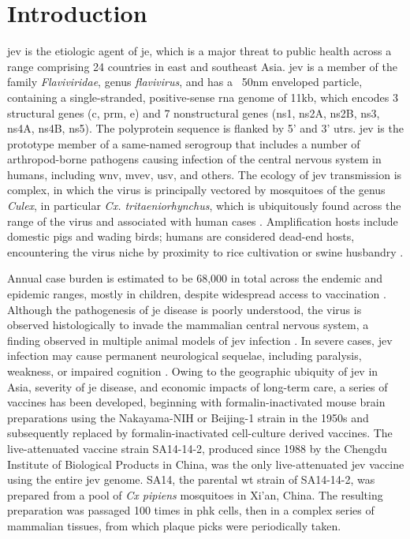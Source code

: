 \section{Introduction}
\Gls{jev} is the etiologic agent of \gls{je}, which is a major threat to public health across a range comprising 24 countries in east and southeast Asia. \Gls{jev} is a member of the family \emph{Flaviviridae}, genus \emph{flavivirus}, and has a ~50\gls{nm} enveloped particle, containing a single-stranded, positive-sense \gls{rna} genome of 11\gls{kb}, which encodes 3 structural genes (\gls{c}, \gls{prm}, \gls{e}) and 7 nonstructural genes (\gls{ns}1, \gls{ns}2A, \gls{ns}2B, \gls{ns}3, \gls{ns}4A, \gls{ns}4B, \gls{ns}5). The polyprotein sequence is flanked by 5’ and 3’ \glspl{utr}. \Gls{jev} is the prototype member of a same-named serogroup that includes a number of arthropod-borne pathogens causing infection of the central nervous system in humans, including \gls{wnv}, \gls{mvev}, \gls{usv}, and others. The ecology of \gls{jev} transmission is complex, in which the virus is principally vectored by mosquitoes of the genus \emph{Culex}, in particular \emph{Cx. tritaeniorhynchus}, which is ubiquitously found across the range of the virus and associated with human cases \parencite{Miller:2012bx}. Amplification hosts include domestic pigs and wading birds; humans are considered dead-end hosts, encountering the virus niche by proximity to rice cultivation or swine husbandry \parencite{Zhao:2014kb}. 

Annual case burden is estimated to be 68,000 in total across the endemic and epidemic ranges, mostly in children, despite widespread access to vaccination \parencite{Campbell:2011gv}.
Although the pathogenesis of \gls{je} disease is poorly understood, the virus is observed histologically to invade the mammalian central nervous system, a finding observed in multiple animal models of \gls{jev} infection \parencite{Li:2015cf,Myint:2014dj,WorldHealthOrganization:2003tq}. In severe cases, \gls{jev} infection may cause permanent neurological sequelae, including paralysis, weakness, or impaired cognition \parencite{Yin:2015fi}. Owing to the geographic ubiquity of \gls{jev} in Asia, severity of \gls{je} disease, and economic impacts of long-term care, a series of vaccines has been developed, beginning with formalin-inactivated mouse brain preparations using the Nakayama-NIH or Beijing-1 strain in the 1950s and subsequently replaced by formalin-inactivated cell-culture derived vaccines. The live-attenuated vaccine strain SA14-14-2, produced since 1988 by the Chengdu Institute of Biological Products in China, was the only live-attenuated \gls{jev} vaccine using the entire \gls{jev} genome.
SA14, the parental \gls{wt} strain of SA14-14-2, was prepared from a pool of \emph{Cx pipiens} mosquitoes in Xi’an, China. The resulting preparation was passaged 100 times in \gls{phk} cells, then in a complex series of mammalian tissues, from which plaque picks were periodically taken. 

